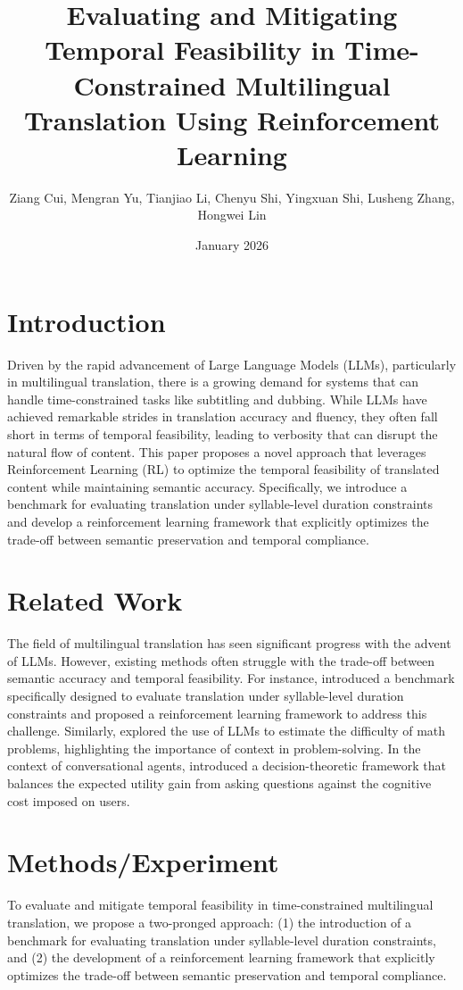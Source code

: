 \documentclass{article}
\title{Evaluating and Mitigating Temporal Feasibility in Time-Constrained Multilingual Translation Using Reinforcement Learning}
\author{Ziang Cui, Mengran Yu, Tianjiao Li, Chenyu Shi, Yingxuan Shi, Lusheng Zhang, Hongwei Lin}
\date{January 2026}
\begin{document}
\maketitle

\section{Introduction}
Driven by the rapid advancement of Large Language Models (LLMs), particularly in multilingual translation, there is a growing demand for systems that can handle time-constrained tasks like subtitling and dubbing. While LLMs have achieved remarkable strides in translation accuracy and fluency, they often fall short in terms of temporal feasibility, leading to verbosity that can disrupt the natural flow of content. This paper proposes a novel approach that leverages Reinforcement Learning (RL) to optimize the temporal feasibility of translated content while maintaining semantic accuracy. Specifically, we introduce a benchmark for evaluating translation under syllable-level duration constraints and develop a reinforcement learning framework that explicitly optimizes the trade-off between semantic preservation and temporal compliance.

\section{Related Work}
The field of multilingual translation has seen significant progress with the advent of LLMs. However, existing methods often struggle with the trade-off between semantic accuracy and temporal feasibility. For instance, \cite{cui2026homuratamingsandglasstimeconstrained} introduced a benchmark specifically designed to evaluate translation under syllable-level duration constraints and proposed a reinforcement learning framework to address this challenge. Similarly, \cite{acquaye2026calculatorsestimatingrealdifficulty} explored the use of LLMs to estimate the difficulty of math problems, highlighting the importance of context in problem-solving. In the context of conversational agents, \cite{dong2026valueinformationframeworkhumanagent} introduced a decision-theoretic framework that balances the expected utility gain from asking questions against the cognitive cost imposed on users.

\section{Methods/Experiment}
To evaluate and mitigate temporal feasibility in time-constrained multilingual translation, we propose a two-pronged approach: (1) the introduction of a benchmark for evaluating translation under syllable-level duration constraints, and (2) the development of a reinforcement learning framework that explicitly optimizes the trade-off between semantic preservation and temporal compliance.
\end{document}
